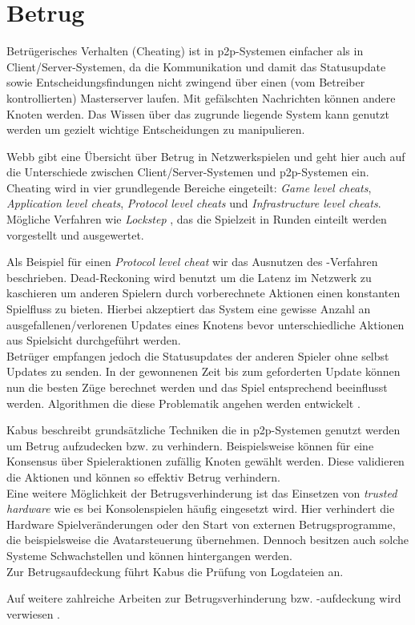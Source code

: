 \section{Betrug}
\label{chap:grundlagen:cheating}
Betrügerisches Verhalten (Cheating) ist in p2p-Systemen einfacher als in Client/Server-Systemen, da die Kommunikation und damit das Statusupdate sowie Entscheidungsfindungen nicht zwingend über einen (vom Betreiber kontrollierten) Masterserver laufen. Mit gefälschten Nachrichten können andere Knoten werden. Das Wissen über das zugrunde liegende System kann genutzt werden um gezielt wichtige Entscheidungen zu manipulieren.

Webb \cite{Webb2007Cheating} gibt eine Übersicht über Betrug in Netzwerkspielen und geht hier auch auf die Unterschiede zwischen Client/Server-Systemen und p2p-Systemen ein. Cheating wird in vier grundlegende Bereiche eingeteilt: \emph{Game level cheats}, \emph{Application level cheats}, \emph{Protocol level cheats} und \emph{Infrastructure level cheats}. Mögliche Verfahren wie \emph{Lockstep} \cite{Baughman2007}, das die Spielzeit in Runden einteilt werden vorgestellt und ausgewertet.

Als Beispiel für einen \emph{Protocol level cheat} wir das Ausnutzen des \emph{}-Verfahren \cite{Pantel2002} beschrieben. Dead-Reckoning wird benutzt um die Latenz im Netzwerk zu kaschieren um anderen Spielern durch vorberechnete Aktionen einen konstanten Spielfluss zu bieten. Hierbei akzeptiert das System eine gewisse Anzahl an ausgefallenen/verlorenen Updates eines Knotens bevor unterschiedliche Aktionen aus Spielsicht durchgeführt werden.\\
Betrüger empfangen jedoch die Statusupdates der anderen Spieler ohne selbst Updates zu senden. In der gewonnenen Zeit bis zum geforderten Update können nun die besten Züge berechnet werden und das Spiel entsprechend beeinflusst werden. Algorithmen die diese Problematik angehen werden entwickelt \cite{Aggarwal2005}.

Kabus \cite{Kabus2005Addressing} beschreibt grundsätzliche Techniken die in p2p-Systemen genutzt werden um Betrug aufzudecken bzw. zu verhindern. Beispielsweise können für eine Konsensus über Spieleraktionen zufällig Knoten gewählt werden. Diese validieren die Aktionen und können so effektiv Betrug verhindern.\\
Eine weitere Möglichkeit der Betrugsverhinderung ist das Einsetzen von \emph{trusted hardware} wie es bei Konsolenspielen häufig eingesetzt wird. Hier verhindert die Hardware Spielveränderungen oder den Start von externen Betrugsprogramme, die beispielsweise die Avatarsteuerung übernehmen. Dennoch besitzen auch solche Systeme Schwachstellen und können hintergangen werden.\\
Zur Betrugsaufdeckung führt Kabus die Prüfung von Logdateien an.

Auf weitere zahlreiche Arbeiten zur Betrugsverhinderung bzw. -aufdeckung wird verwiesen \cite{Ferretti2008Cheating, Gauthierdickey2004Low, Kabus2007Design, Dautermann2007, Kabus2009}.
